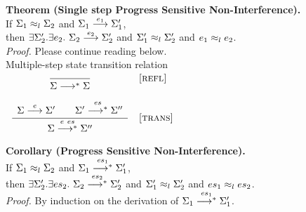 \textbf{Theorem (Single step Progress Sensitive Non-Interference).}
\\
If $\lequiv{l}{\Sigma_1}{\Sigma_2}$
and $\sstep{e_1}{\Sigma_1}{\Sigma_1'}$,
\\
then $\exists \Sigma_2'.\exists e_2.~\sstep{e_2}{\Sigma_2}{\Sigma_2'}$
and $\lequiv{l}{\Sigma_1'}{\Sigma_2'}$
and $\lequiv{l}{e_1}{e_2}$.
\\
\textit{Proof.}
Please continue reading below.
\\
 Multiple-step state transition relation
\\
$\startrules
  \mrule{refl}{
  }{
    \sstepstar{}{\Sigma}{\Sigma}
  }
  \mrule{trans}{
      \sstep{e}{\Sigma}{\Sigma'}
    \qquad
      \sstepstar{es}{\Sigma'}{\Sigma''}
  }{
    \sstepstar{e~es}{\Sigma}{\Sigma''}
  }
\finishrules$
\\
\textbf{Corollary (Progress Sensitive Non-Interference).}
\\
If $\lequiv{l}{\Sigma_1}{\Sigma_2}$
and $\sstepstar{es_1}{\Sigma_1}{\Sigma_1'}$,
\\
then $\exists \Sigma_2'.\exists es_2.~\sstepstar{es_2}{\Sigma_2}{\Sigma_2'}$
and $\lequiv{l}{\Sigma_1'}{\Sigma_2'}$
and $\lequiv{l}{es_1}{es_2}$.
\\
\textit{Proof.}
By induction on the derivation of $\sstepstar{es_1}{\Sigma_1}{\Sigma_1'}$.

